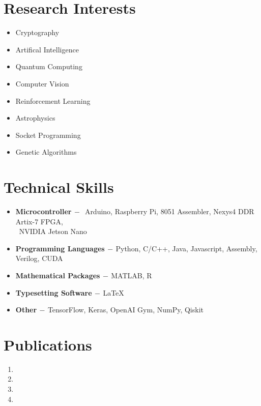 \documentclass[a4paper, 12pt]{article}
\begin{document}
    \section*{Research Interests}
    \begin{multicols}{2}
    	\begin{itemize}
    		\item Cryptography
    		\item Artifical Intelligence
    		\item Quantum Computing
    		\item Computer Vision
    		\item Reinforcement Learning
    		\item Astrophysics
    		\item Socket Programming
    		\item Genetic Algorithms
    	\end{itemize}
    \end{multicols}

    \section*{Technical Skills}
	\begin{flushleft}
	    \begin{itemize}
	    	\item \textbf{Microcontroller}$\,-\,$ Arduino, Raspberry Pi, 8051 Assembler,  Nexys4 DDR Artix-7 FPGA,\\\qquad\qquad\qquad\quad\qquad\, NVIDIA Jetson Nano
	        \item \textbf{Programming Languages}$\,-\,$Python, C/C++, Java, Javascript, Assembly, Verilog, CUDA
	        \item \textbf{Mathematical Packages}$\,-\,$MATLAB, R
	        \item \textbf{Typesetting Software}$\,-\,$\LaTeX
	        \item \textbf{Other}$\,-\,$TensorFlow, Keras, OpenAI Gym, NumPy, Qiskit
	    \end{itemize}
	\end{flushleft}
	
	\section*{Publications}
  	\begin{enumerate}
  	    \item {}
  	    \item {}
  		\item {}
  		\item {}
  	\end{enumerate}
  	
\end{document}
